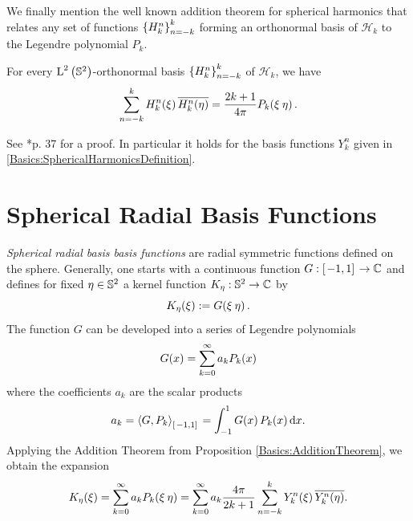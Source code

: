 We finally mention the well known addition theorem for spherical harmonics 
that relates any set of functions $\left\{H_k^n\right\rbrace_{n=-k}^k$ forming an orthonormal basis of $\mathcal{H}_k$ 
to the Legendre polynomial $P_{k}$.

\begin{proposition}
  \label{Basics:AdditionTheorem}
  For every $\text{\rm{L}}^{2}\left(\mathbb{S}^2\right)$-orthonormal basis 
  $\left\{H_{k}^n\right\rbrace_{n=-k}^{k}$ of $\mathcal{H}_k$, we have
  \begin{equation}
    \nonumber
    \sum_{n=-k}^{k} H_{k}^n{\hspace{-0.4ex}}\left(\mathbf{\xi}\right) \overline{H_{k}^n{\hspace{-0.4ex}}\left(\mathbf{\eta}\right)} =
    \frac{2k+1}{4\pi}P_k{\hspace{-0.4ex}}\left(\mathbf{\xi} \: \mathbf{\eta}\right).
  \end{equation}
\end{proposition}

See \cite{frgesc}*{p. 37} for a proof. In particular it holds for the basis functions $Y_{k}^n$ given in 
\eqref{Basics:SphericalHarmonicsDefinition}.

\section{Spherical Radial Basis Functions}
\emph{Spherical radial basis basis functions} are radial symmetric functions defined on the sphere. 
Generally, one starts with a continuous function $G: \left[\left.-1,1\right]\right. \rightarrow \mathbb{C}$ and defines 
for fixed $\mathbf{\eta} \in \mathbb{S}^2$ a kernel function $K_{\mathbf{\eta}}: \mathbb{S}^2 \rightarrow \mathbb{C}$ by
$$ K_{\mathbf{\eta}}{\hspace{-0.4ex}}\left(\mathbf{\xi}\right) := G{\hspace{-0.4ex}}\left(\mathbf{\xi} \: \mathbf{\eta}\right).$$
The function $G$ can be developed into a series of Legendre polynomials
$$ G{\hspace{-0.4ex}}\left(x\right) = \sum_{k = 0}^{\infty} a_k P_k{\hspace{-0.4ex}}\left(x\right)$$
where the coefficients $a_k$ are the scalar products
$$ a_k = \left<G,P_{k}\right>_{\left[\left.-1,1\right]\right.} = \int_{-1}^{1} G{\hspace{-0.4ex}}\left(x\right) P_k{\hspace{-0.4ex}}\left(x\right) \text{\rm{d}} x.$$
Applying the Addition Theorem from Proposition \ref{Basics:AdditionTheorem}, we obtain the expansion
$$K_{\mathbf{\eta}}{\hspace{-0.4ex}}\left(\mathbf{\xi}\right) = \sum_{k = 0}^{\infty} a_k P_k{\hspace{-0.4ex}}\left(\mathbf{\mathbf{\xi}} \: \mathbf{\eta}\right) =  
\sum_{k = 0}^{\infty} a_k \frac{4\pi}{2k+1} \sum_{n=-k}^k Y_{k}^n{\hspace{-0.4ex}}\left(\mathbf{\xi}\right) \overline{Y_{k}^n{\hspace{-0.4ex}}\left(\mathbf{\eta}\right)}.$$

